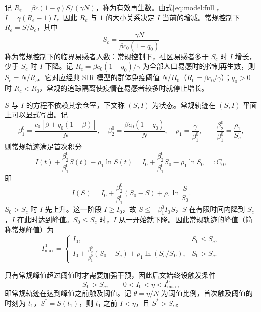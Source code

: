 记 $R_e=\beta c(1-q)S/(\gamma N)$，称为有效再生数。由式\eqref{eq:model:full}，$\dot I=\gamma(R_e-1)I$，因此 $R_e$ 与 $1$ 的大小关系决定 $I$ 当前的增减。常规控制下 $R_e=S/S_c$，其中
\begin{equation}
S_c=\frac{\gamma N}{\beta c_0(1-q_0)}
\label{eq:model:Sc}
\end{equation}
称为常规控制下的临界易感者人数：常规控制下，社区易感者多于 $S_c$ 时 $I$ 增长，少于 $S_c$ 时 $I$ 下降。记 $R_c=\beta c_0(1-q_0)/\gamma$ 为全部人口易感时的控制再生数，则 $S_c=N/R_c$。它对应经典 SIR 模型的群体免疫阈值 $N/R_0$（$R_0=\beta c_0/\gamma$）；$q_0>0$ 时 $R_c<R_0$，常规的追踪隔离使疫情在易感者较多时就停止增长。

$S$ 与 $I$ 的方程不依赖其余仓室，下文称 $(S,I)$ 为状态。常规轨迹在 $(S,I)$ 平面上可以显式写出。记
\begin{equation}
\beta_1^0=\frac{c_0[\beta+q_0(1-\beta)]}{N},\quad
\beta_2^0=\frac{\beta c_0(1-q_0)}{N},\quad
\rho_1=\frac{\gamma}{\beta_1^0},\qquad
\frac{\beta_2^0}{\beta_1^0}=\frac{\rho_1}{S_c},
\label{eq:model:beta12-baseline}
\end{equation}
则常规轨迹满足首次积分
\begin{equation}
I(t)+\frac{\beta_2^0}{\beta_1^0}S(t)-\rho_1\ln S(t)=I_0+\frac{\beta_2^0}{\beta_1^0}S_0-\rho_1\ln S_0=:C_0,
\label{eq:model:first-integral}
\end{equation}
即
\begin{equation}
I(S)=I_0+\frac{\beta_2^0}{\beta_1^0}(S_0-S)+\rho_1\ln\frac{S}{S_0}.
\label{eq:model:routine-orbit}
\end{equation}
$S_0>S_c$ 时 $I$ 先上升。这一阶段 $I\ge I_0$，故 $\dot S\le-\beta_1^0I_0S$，$S$ 在有限时间内降到 $S_c$，$I$ 在此时达到峰值。$S_0\le S_c$ 时，$I$ 从一开始就下降。因此常规轨迹的峰值（简称常规峰值）为
\begin{equation}
I_{\max}^{0}=\begin{cases}
I_0,&S_0\le S_c,\\
I_0+\frac{\beta_2^0}{\beta_1^0}(S_0-S_c)+\rho_1\ln(S_c/S_0),&S_0>S_c.
\end{cases}
\label{eq:s1:Imax-no}
\end{equation}

只有常规峰值超过阈值时才需要加强干预，因此后文始终设触发条件
\begin{equation}
S_0>S_c,\qquad 0<I_0<\eta<I_{\max}^{0},
\label{eq:model:trigger}
\end{equation}
即常规轨迹在达到峰值之前触及阈值。记 $\theta=\eta/N$ 为阈值比例，首次触及阈值的时刻为 $t_1$，$S^*=S(t_1)$，则 $t_1$ 之前 $I<\eta$，且 $S^*>S_c$。


